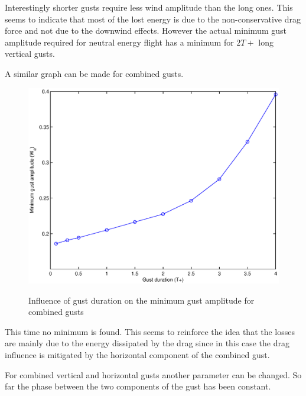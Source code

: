 \FloatBarrier

\par Interestingly shorter gusts require less wind amplitude than the long ones.
This seems to indicate that most of the lost energy is due to the non-conservative drag force and not due to the downwind effects.
However the actual minimum gust amplitude required for neutral energy flight has a minimum for $2T+$ long vertical gusts.

\par A similar graph can be made for combined gusts.

\begin{figure}[h!]
	\begin{center}
		\scalebox{0.8}
		{\includegraphics{./Figures/combined_gust_amplitude_vs_duration.eps}}
	\end{center}
	\caption{Influence of gust duration on the minimum gust amplitude for combined gusts}
	\label{fig:combined_amplitude_duration}
\end{figure}


\FloatBarrier

\par This time no minimum is found.
This seems to reinforce the idea that the losses are mainly due to the energy dissipated by the drag since in this case the drag influence is mitigated by the horizontal component of the combined gust.


For combined vertical and horizontal gusts another parameter can be changed.
So far the phase between the two components of the gust has been constant.

